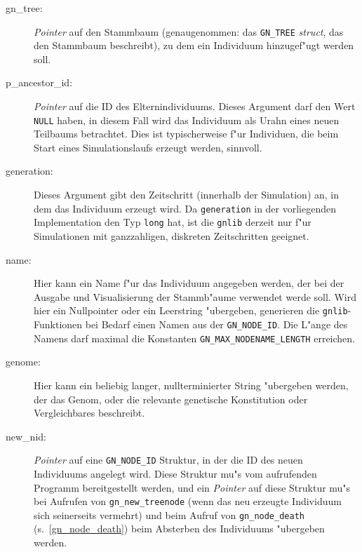 \documentclass[a4paper, fleqn]{article}
\begin{document}
\begin{description}

\item[gn\_tree:] \textsl{Pointer} auf den Stammbaum (genaugenommen: das
    \verb|GN_TREE| \textsl{struct}, das den Stammbaum beschreibt), zu dem
    ein Individuum hinzugef"ugt werden soll.

\item[p\_ancestor\_id:] \textsl{Pointer} auf die ID des Elternindividuums.
    Dieses Argument darf den Wert \verb|NULL| haben, in diesem Fall wird
    das Individuum als Urahn eines neuen Teilbaums betrachtet. Dies ist
    typischerweise f"ur Individuen, die beim Start eines Simulationslaufs
    erzeugt werden, sinnvoll.

\item[generation:] Dieses Argument gibt den Zeitschritt (innerhalb der Simulation)
    an, in dem das Individuum erzeugt wird. Da \verb|generation| in der
    vorliegenden Implementation den Typ \verb|long| hat, ist die \texttt{gnlib}
    derzeit nur f"ur Simulationen mit ganzzahligen, diskreten Zeitschritten
    geeignet.

\item[name:] Hier kann ein Name f"ur das Individuum angegeben werden, der bei
    der Ausgabe und Visualisierung der Stammb"aume verwendet werde soll.
    Wird hier ein Nullpointer oder ein Leerstring "ubergeben, generieren die
    \texttt{gnlib}-Funktionen bei Bedarf einen Namen aus der \verb|GN_NODE_ID|.
    Die L"ange des Namens darf maximal die Konstanten \verb|GN_MAX_NODENAME_LENGTH|
    erreichen.

\item[genome:] Hier kann ein beliebig langer, nullterminierter String "ubergeben
    werden, der das Genom, oder die relevante genetische Konstitution oder
    Vergleichbares beschreibt.

\item[new\_nid:] \textsl{Pointer} auf eine \verb|GN_NODE_ID| Struktur, in der
    die ID des neuen Individuums angelegt wird. Diese Struktur mu"s vom
    aufrufenden Programm bereitgestellt werden, und ein \textsl{Pointer}
    auf diese Struktur mu"s bei Aufrufen von \verb|gn_new_treenode| (wenn das
    neu erzeugte Individuum sich seinerseits vermehrt) und beim Aufruf von
    \verb|gn_node_death| (s.\ \ref{gn_node_death}) beim Absterben des Individuums
    "ubergeben werden.

\end{description}
\end{document}
